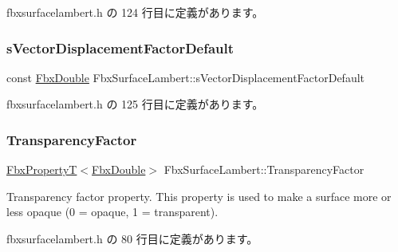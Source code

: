  fbxsurfacelambert.\+h の 124 行目に定義があります。

\mbox{\label{class_fbx_surface_lambert_a76cd8871ef0d347837dde4caf23e6f71}} 
\subsubsection{\texorpdfstring{s\+Vector\+Displacement\+Factor\+Default}{sVectorDisplacementFactorDefault}}
{\footnotesize\ttfamily const \hyperlink{fbxtypes_8h_a171e72a1c46fc15c1a6c9c31948c1c5b}{Fbx\+Double} Fbx\+Surface\+Lambert\+::s\+Vector\+Displacement\+Factor\+Default\hspace{0.3cm}{\ttfamily [static]}}



 fbxsurfacelambert.\+h の 125 行目に定義があります。

\mbox{\label{class_fbx_surface_lambert_a9fbe9676ad1a4f56bcbde345113ccccd}} 
\subsubsection{\texorpdfstring{Transparency\+Factor}{TransparencyFactor}}
{\footnotesize\ttfamily \hyperlink{class_fbx_property_t}{Fbx\+PropertyT}$<$\hyperlink{fbxtypes_8h_a171e72a1c46fc15c1a6c9c31948c1c5b}{Fbx\+Double}$>$ Fbx\+Surface\+Lambert\+::\+Transparency\+Factor}

Transparency factor property. This property is used to make a surface more or less opaque (0 = opaque, 1 = transparent). 

 fbxsurfacelambert.\+h の 80 行目に定義があります。

\mbox{\label{class_fbx_surface_lambert_a29a56ddffd15311f51d0b2cbb09d4659}} 
